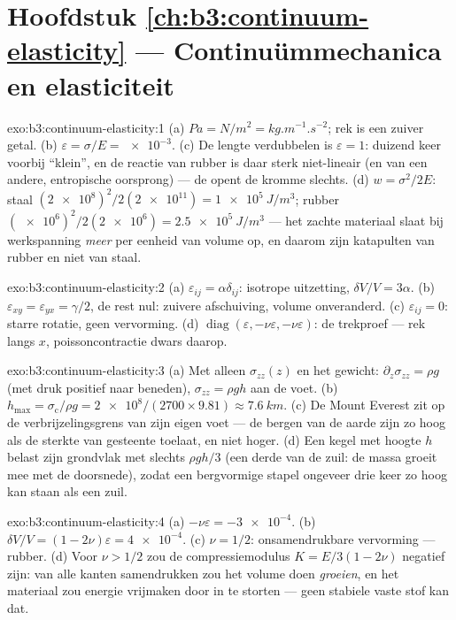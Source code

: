 \section*{Hoofdstuk \ref{ch:b3:continuum-elasticity} --- Continuümmechanica en elasticiteit}

\begin{solution}{exo:b3:continuum-elasticity:1}
(a) $\unit{Pa} = \unit{N/m^2} = \unit{kg.m^{-1}.s^{-2}}$; rek is een
zuiver getal. (b) $\varepsilon = \sigma/E = \num{e-3}$. (c) De lengte
verdubbelen is $\varepsilon = 1$: duizend keer voorbij ``klein'', en de
reactie van rubber is daar sterk niet-lineair (en van een andere,
entropische oorsprong) --- de  opent de kromme slechts. (d)
$w =
\sigma^2/2E$: staal $(\num{2e8})^2/2(\num{2e11}) =
\qty{1e5}{J/m^3}$; rubber $(\num{e6})^2/2(\num{2e6}) =
\qty{2.5e5}{J/m^3}$ --- het zachte materiaal slaat bij werkspanning
\emph{meer} per eenheid van volume op, en daarom zijn katapulten van
rubber en niet van staal.
\end{solution}

\begin{solution}{exo:b3:continuum-elasticity:2}
(a) $\varepsilon_{ij} = \alpha\delta_{ij}$: isotrope uitzetting,
$\delta V/V = 3\alpha$. (b) $\varepsilon_{xy} = \varepsilon_{yx} =
\gamma/2$, de rest nul: zuivere afschuiving, volume onveranderd. (c)
$\varepsilon_{ij} = 0$: starre rotatie, geen vervorming. (d)
$\operatorname{diag}(\varepsilon, -\nu\varepsilon, -\nu\varepsilon)$:
de trekproef --- rek langs $x$, poissoncontractie dwars daarop.
\end{solution}

\begin{solution}{exo:b3:continuum-elasticity:3}
(a) Met alleen $\sigma_{zz}(z)$ en het gewicht: $\partial_z\sigma_{zz} =
\rho g$ (met druk positief naar beneden), $\sigma_{zz} = \rho
gh$ aan de
voet. (b) $h_{\max} = \sigma_{\text{c}}/\rho g =
\num{2e8}/(2700 \times 9.81) \approx \qty{7.6}{km}$. (c) De Mount
Everest zit op de verbrijzelingsgrens van zijn eigen voet --- de bergen
van de aarde zijn zo hoog als de sterkte van gesteente toelaat, en niet
hoger. (d) Een kegel met hoogte $h$ belast zijn grondvlak met slechts
$\rho gh/3$ (een derde van de zuil: de massa groeit mee met de
doorsnede), zodat een bergvormige stapel ongeveer drie keer zo hoog kan
staan als een zuil.
\end{solution}

\begin{solution}{exo:b3:continuum-elasticity:4}
(a) $-\nu\varepsilon = \num{-3e-4}$. (b) $\delta V/V = (1 -
2\nu)\varepsilon = \num{4e-4}$. (c) $\nu = 1/2$: onsamendrukbare
vervorming --- rubber. (d) Voor $\nu > 1/2$ zou de compressiemodulus $K =
E/3(1 - 2\nu)$ negatief zijn: van alle kanten samendrukken zou het volume
doen \emph{groeien}, en het materiaal zou energie vrijmaken door in te
storten --- geen stabiele vaste stof kan dat.
\end{solution}

